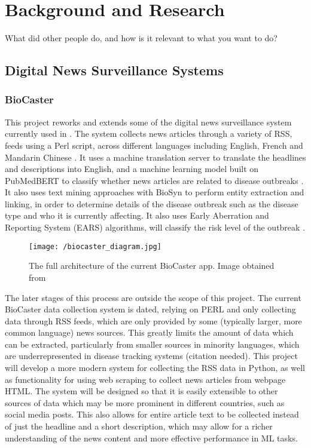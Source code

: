 \documentclass{l4proj}
\begin{document}
\chapter{Background and Research}
What did other people do, and how is it relevant to what you want to do?
\section{Digital News Surveillance Systems}
\subsection*{BioCaster}
This project reworks and extends some of the digital news surveillance system currently used in \cite{biocaster}. The system collects news articles through a variety of RSS,  feeds using a Perl script, across different languages including English, French and Mandarin Chinese \citep{collier2008biocaster}. It uses a machine translation server to translate the headlines and descriptions into English, and a machine learning model built on PubMedBERT \citep{gu2021domain} to classify whether news articles are related to disease outbreaks \citep{meng2022biocaster}. It also uses text mining approaches with BioSyn \citep{sung2020biomedical} to perform entity extraction and linking, in order to determine details of the disease outbreak such as the disease type and who it is currently affecting. It also uses Early Aberration and Reporting System (EARS) algorithms, will classify the risk level of the outbreak \citep{collier2011towards}. 
\begin{figure}[h]
\texttt{[image: /biocaster\_diagram.jpg]}
\caption{The full architecture of the current BioCaster app. Image obtained from \cite{meng2022biocaster}}
\label{fig:biocaster_architecture}
\end{figure}
\par
The later stages of this process are outside the scope of this project. The current BioCaster data collection system is dated, relying on PERL and only collecting data through RSS feeds, which are only provided by some (typically larger, more common language) news sources. This greatly limits the amount of data which can be extracted, particularly from smaller sources in minority languages, which are underrepresented in disease tracking systems (citation needed). This project will develop a more modern system for collecting the RSS data in Python, as well as functionality for using web scraping to collect news articles from webpage HTML. The system will be designed so that it is easily extensible to other sources of data which may be more prominent in different countries, such as social media posts. This also allows for entire article text to be collected instead of just the headline and a short description, which may allow for a richer understanding of the news content and more effective performance in ML tasks.
\end{document}
